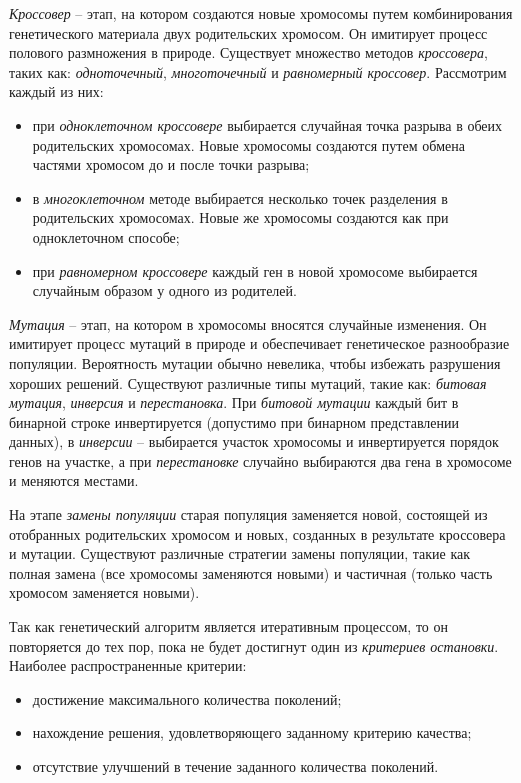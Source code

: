 \documentclass[master,paper]{pmk-graduate}
\begin{document}
\textit{Кроссовер} -- этап, на котором создаются новые хромосомы путем комбинирования генетического материала двух родительских хромосом. Он имити\-рует процесс полового размножения в природе. Существует множество методов \textit{кроссовера}, таких как: \textit{одноточечный}, \textit{многоточечный} и \textit{равномерный кроссовер}. Рассмотрим каждый из них:
\begin{itemize}
\item при \textit{одноклеточном кроссовере} выбирается случайная точка разрыва в обеих родительских хромосомах. Новые хромосомы создаются путем обмена частями хромосом до и после точки разрыва;
\item в \textit{многоклеточном} методе выбирается несколько точек разделения в родительских хромосомах. Новые же хромосомы создаются как при одноклеточном способе;
\item при \textit{равномерном кроссовере} каждый ген в новой хромосоме выбирает\-ся случайным образом у одного из родителей.
\end{itemize}

\textit{Мутация} -- этап, на котором в хромосомы вносятся случайные изменения. Он имитирует процесс мутаций в природе и обеспечивает генетическое разнообразие популяции. Вероятность мутации обычно невелика, чтобы избежать разрушения хороших решений. Существуют различные типы мутаций, такие как: \textit{битовая мутация}, \textit{инверсия} и \textit{перестановка}. При \textit{битовой мутации} каждый бит в бинарной строке инвертируется (допустимо при бинарном представлении данных), в \textit{инверсии} -- выбирается участок хромосомы и инвертируется порядок генов на участке, а при \textit{перестановке} случайно выбираются два гена в хромосоме и меняются местами.

На этапе \textit{замены популяции} старая популяция заменяется новой, состоящей из отобранных родительских хромосом и новых, созданных в результате кроссовера и мутации. Существуют различные стратегии замены популяции, такие как полная замена (все хромосомы заменяются новыми) и частичная (только часть хромосом заменяется новыми).

Так как генетический алгоритм является итеративным процессом, то он повторяется до тех пор, пока не будет достигнут один из \textit{критериев остановки}. Наиболее распространенные критерии:
\begin{itemize}
\item достижение максимального количества поколений;
\item нахождение решения, удовлетворяющего заданному критерию качества;
\item отсутствие улучшений в течение заданного количества поколений.
\end{itemize}
\end{document}

